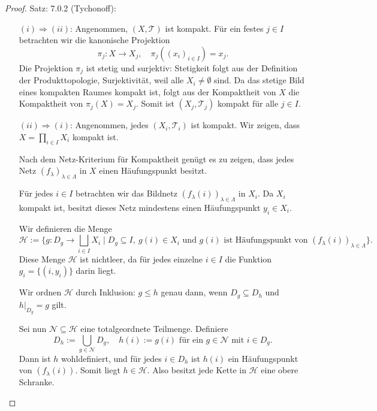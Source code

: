 \begin{proof}{Satz: 7.0.2 (Tychonoff):}\\
    \begin{enumerate}
    \item[$(i) \Rightarrow (ii)$:] 
    Angenommen, $(X, \mathcal{T})$ ist kompakt. 
    Für ein festes $j \in I$ betrachten wir die kanonische Projektion
    $$
    \pi_j : X \to X_j, \quad \pi_j((x_i)_{i \in I}) = x_j.
    $$
    Die Projektion $\pi_j$ ist stetig und surjektiv: 
    Stetigkeit folgt aus der Definition der Produkttopologie, 
    Surjektivität, weil alle $X_i \neq \emptyset$ sind. 
    Da das stetige Bild eines kompakten Raumes kompakt ist, 
    folgt aus der Kompaktheit von $X$ die Kompaktheit von $\pi_j(X) = X_j$. 
    Somit ist $(X_j, \mathcal{T}_j)$ kompakt für alle $j \in I$.

    \item[$(ii) \Rightarrow (i)$:] 
    Angenommen, jedes $(X_i, \mathcal{T}_i)$ ist kompakt. 
    Wir zeigen, dass $X = \prod_{i \in I} X_i$ kompakt ist.

    Nach dem Netz-Kriterium für Kompaktheit genügt es zu zeigen, 
    dass jedes Netz $(f_\lambda)_{\lambda \in \Lambda}$ in $X$ 
    einen Häufungspunkt besitzt.

    Für jedes $i \in I$ betrachten wir das Bildnetz 
    $(f_\lambda(i))_{\lambda \in \Lambda}$ in $X_i$. 
    Da $X_i$ kompakt ist, besitzt dieses Netz mindestens einen Häufungspunkt $y_i \in X_i$. 

    Wir definieren die Menge
    $$
    \mathcal{H} := \{ g : D_g \to \bigsqcup_{i \in I} X_i \mid 
    D_g \subseteq I,\ g(i) \in X_i \text{ und } g(i) \text{ ist Häufungspunkt von } 
    (f_\lambda(i))_{\lambda \in \Lambda} \}.
    $$
    Diese Menge $\mathcal{H}$ ist nichtleer, 
    da für jedes einzelne $i \in I$ die Funktion $g_i = \{(i, y_i)\}$ darin liegt.

    Wir ordnen $\mathcal{H}$ durch Inklusion: 
    $g \le h$ genau dann, wenn $D_g \subseteq D_h$ und $h|_{D_g} = g$ gilt.

    Sei nun $\mathcal{N} \subseteq \mathcal{H}$ eine totalgeordnete Teilmenge. 
    Definiere 
    $$
    D_h := \bigcup_{g \in \mathcal{N}} D_g, 
    \quad h(i) := g(i) \text{ für ein } g \in \mathcal{N} \text{ mit } i \in D_g.
    $$
    Dann ist $h$ wohldefiniert, 
    und für jedes $i \in D_h$ ist $h(i)$ ein Häufungspunkt von $(f_\lambda(i))$. 
    Somit liegt $h \in \mathcal{H}$. 
    Also besitzt jede Kette in $\mathcal{H}$ eine obere Schranke. 


\end{enumerate}
\end{proof}
